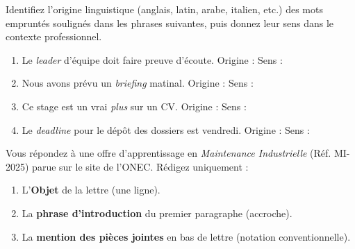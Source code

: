 \documentclass[11pt]{article}
\begin{document}
\begin{exercice}
Identifiez l'origine linguistique (anglais, latin, arabe, italien, etc.) des mots empruntés soulignés dans les phrases suivantes, puis donnez leur sens dans le contexte professionnel.

\begin{enumerate}
\item Le \textit{leader} d'équipe doit faire preuve d'écoute. \hfill Origine : \dotfill \quad Sens : \dotfill
\item Nous avons prévu un \textit{briefing} matinal. \hfill Origine : \dotfill \quad Sens : \dotfill
\item Ce stage est un vrai \textit{plus} sur un CV. \hfill Origine : \dotfill \quad Sens : \dotfill
\item Le \textit{deadline} pour le dépôt des dossiers est vendredi. \hfill Origine : \dotfill \quad Sens : \dotfill
\end{enumerate}
\end{exercice}

\begin{exercice}
Vous répondez à une offre d'apprentissage en \textit{Maintenance Industrielle} (Réf. MI-2025) parue sur le site de l'ONEC. Rédigez uniquement :
\begin{enumerate}
\item L'\textbf{Objet} de la lettre (une ligne).
\item La \textbf{phrase d'introduction} du premier paragraphe (accroche).
\item La \textbf{mention des pièces jointes} en bas de lettre (notation conventionnelle).
\end{enumerate}
\end{exercice}
\end{document}
